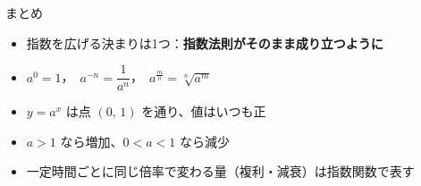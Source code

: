 \documentclass[aspectratio=169]{beamer}
\begin{document}
\begin{frame}{まとめ}
  \begin{itemize}
    \item 指数を広げる決まりは1つ：\textbf{指数法則がそのまま成り立つように}
    \item $a^0 = 1$，\ $a^{-n} = \dfrac{1}{a^n}$，\ $a^{\frac{m}{n}} = \sqrt[n]{a^m}$
    \item $y = a^x$ は点 $(0,\,1)$ を通り、値はいつも正
    \item $a > 1$ なら増加、$0 < a < 1$ なら減少
    \item 一定時間ごとに同じ倍率で変わる量（複利・減衰）は指数関数で表す
  \end{itemize}
  \bigskip
\end{frame}
\end{document}

